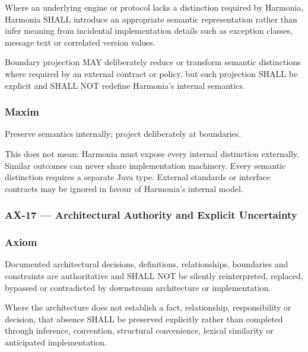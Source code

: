 Where an underlying engine or protocol lacks a distinction required by Harmonia, Harmonia SHALL introduce an appropriate semantic representation rather than infer meaning from incidental implementation details such as exception classes, message text or correlated version values.

\label{rad:axioms:698}

Boundary projection MAY deliberately reduce or transform semantic distinctions where required by an external contract or policy, but such projection SHALL be explicit and SHALL NOT redefine Harmonia's internal semantics.

\label{rad:axioms:700}
\subsubsection*{Maxim}
\label{rad:axioms:701}

Preserve semantics internally; project deliberately at boundaries.

\label{rad:axioms:703}

This does not mean: Harmonia must expose every internal distinction externally. Similar outcomes can never share implementation machinery. Every semantic distinction requires a separate Java type. External standards or interface contracts may be ignored in favour of Harmonia's internal model.

\label{rad:axioms:705}



\label{rad:axioms:772}
\subsubsection*{AX-17 — Architectural Authority and Explicit Uncertainty}
\label{rad:axioms:774}
\subsubsection*{Axiom}
\label{rad:axioms:776}

Documented architectural decisions, definitions, relationships, boundaries and constraints are authoritative and SHALL NOT be silently reinterpreted, replaced, bypassed or contradicted by downstream architecture or implementation.

\label{rad:axioms:781}

Where the architecture does not establish a fact, relationship, responsibility or decision, that absence SHALL be preserved explicitly rather than completed through inference, convention, structural convenience, lexical similarity or anticipated implementation.

